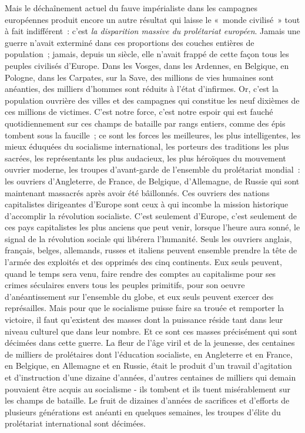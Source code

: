 \documentclass[french,twoside]{book} %
\begin{document}
Mais le déchaînement actuel du fauve impérialiste dans les campagnes européennes produit encore un autre résultat qui laisse le « monde civilisé » tout à fait indifférent : c’est \emph{la disparition massive du prolétariat européen}. Jamais une guerre n’avait exterminé dans ces proportions des couches entières de population ; jamais, depuis un siècle, elle n’avait frappé de cette façon tous les peuples civilisés d’Europe. Dans les Vosges, dans les Ardennes, en Belgique, en Pologne, dans les Carpates, sur la Save, des millions de vies humaines sont anéanties, des milliers d’hommes sont réduits à l’état d’infirmes. Or, c’est la population ouvrière des villes et des campagnes qui constitue les neuf dixièmes de ces millions de victimes. C'est notre  force, c’est notre espoir qui est fauché quotidiennement sur ces champs de bataille par rangs entiers, comme des épis tombent sous la faucille ; ce sont les forces les meilleures, les plus intelligentes, les mieux éduquées du socialisme international, les porteurs des traditions les plus sacrées, les représentants les plus audacieux, les plus héroïques du mouvement ouvrier moderne, les troupes d’avant-garde de l’ensemble du prolétariat mondial : les ouvriers d’Angleterre, de France, de Belgique, d’Allemagne, de Russie qui sont maintenant massacrés après avoir été bâillonnés. Ces ouvriers des nations capitalistes dirigeantes d’Europe sont ceux à qui incombe la mission historique d’accomplir la révolution socialiste. C'est seulement d’Europe, c’est seulement de ces pays capitalistes les plus anciens que peut venir, lorsque l’heure aura sonné, le signal de la révolution sociale qui libérera l’humanité. Seuls les ouvriers anglais, français, belges, allemands, russes et italiens peuvent ensemble prendre la tête de l’armée des exploités et des opprimés des cinq continents. Eux seuls peuvent, quand le temps sera venu, faire rendre des comptes au capitalisme pour ses crimes séculaires envers tous les peuples primitifs, pour son oeuvre d’anéantissement sur l’ensemble du globe, et eux seuls peuvent exercer des représailles. Mais pour que le socialisme puisse faire sa trouée et remporter la victoire, il faut qu’existent des masses dont la puissance réside tant dans leur niveau culturel que dans leur nombre. Et ce sont ces masses précisément qui sont décimées dans cette guerre. La fleur de l’âge viril et de la jeunesse, des centaines de milliers de prolétaires dont l’éducation socialiste, en Angleterre et en France, en Belgique, en Allemagne et en Russie, était le produit d’un travail d’agitation et d’instruction d’une dizaine d’années, d’autres centaines de milliers qui demain pouvaient être acquis au socialisme - ils tombent et ils tuent misérablement sur les champs de bataille. Le fruit de dizaines d’années de sacrifices et d’efforts de plusieurs générations est anéanti en quelques semaines, les troupes d’élite du prolétariat international sont décimées.\par
\end{document}
